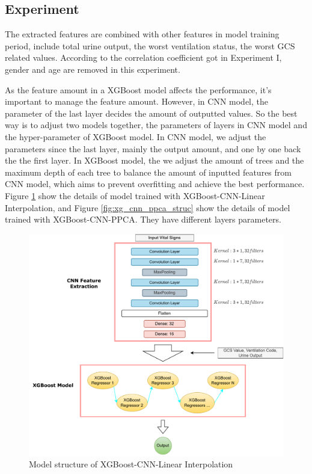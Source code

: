 \documentclass[12pt,a4paper,english
]{tunithesis}
\begin{document}
\subsection{Experiment}
The extracted features are combined with other features in model training period, include total urine output, the worst ventilation status, the worst GCS related values. According to the correlation coefficient got in Experiment I, gender and age are removed in this experiment. 

As the feature amount in a XGBoost model affects the performance, it's important to manage the feature amount. However, in CNN model, the parameter of the last layer decides the amount of outputted values. So the best way is to adjust two models together, the parameters of layers in CNN model and the hyper-parameter of XGBoost model. In CNN model, we adjust the parameters since the last layer, mainly the output amount, and one by one back the the first layer. In XGBoost model, the we adjust the amount of trees and the maximum depth of each tree to balance the amount of inputted features from CNN model, which aims to prevent overfitting and achieve the best performance. Figure \ref{fig:xg_cnn_li_struc} show the details of model trained with XGBoost-CNN-Linear Interpolation, and Figure \ref{fig:xg_cnn_ppca_struc} show the details of model trained with XGBoost-CNN-PPCA. They have different layers parameters.

\begin{figure}
  \begin{center}
    \includegraphics[width=1\textwidth]{thesis/img/xg_cnn_li.pdf}
  \end{center}
  \caption[XGBoost-CNN-LI model]{Model structure of XGBoost-CNN-Linear Interpolation}
  \label{fig:xg_cnn_li_struc}
\end{figure}
\end{document}
